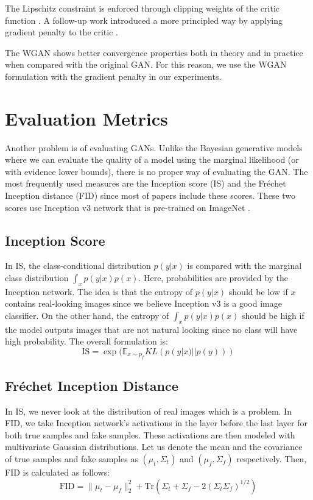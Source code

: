 \documentclass[a4paper,onesided,12pt]{report}
\begin{document}
The Lipschitz constraint is enforced through clipping weights of the critic function \cite{arjovsky2017wasserstein}. A follow-up work introduced a more principled way by applying gradient penalty to the critic \cite{gulrajani2017improved}.

The WGAN shows better convergence properties both in theory and in practice when compared with the original GAN. For this reason, we use the WGAN formulation with the gradient penalty \cite{gulrajani2017improved} in our experiments.

\section{Evaluation Metrics}
\label{sec:evaluation}

Another problem is of evaluating GANs. Unlike the Bayesian generative models where we can evaluate the quality of a model using the marginal likelihood (or with evidence lower bounds), there is no proper way of evaluating the GAN. The most frequently used measures are the Inception score (IS) \cite{salimans2016improved} and the Fr\'echet Inception distance (FID) \cite{heusel2017gans} since most of papers include these scores. These two scores use Inception v3 network \cite{szegedy2016rethinking} that is pre-trained on ImageNet \cite{deng2009imagenet}.

\subsection{Inception Score}
\label{subsec:is}
In IS, the class-conditional distribution $p(y|x)$ is compared with the marginal class distribution $\int_x p(y|x) p(x)$. Here, probabilities are provided by the Inception network. The idea is that the entropy of $p(y|x)$ should be low if $x$ contains real-looking images since we believe Inception v3 is a good image classifier. On the other hand, the entropy of $\int_x p(y | x) p(x)$ should be high if the model outputs images that are not natural looking since no class will have high probability. The overall formulation is:
\begin{equation}
\label{eq:is}
\text{IS}=\exp (\mathbb{E}_{x \sim p_f} KL (p(y|x) || p(y))) 
\end{equation}

\subsection{Fr\'echet Inception Distance}
\label{subsec:fid}
In IS, we never look at the distribution of real images which is a problem. In FID, we take Inception network's activations in the layer before the last layer for both true samples and fake samples. These activations are then modeled with multivariate Gaussian distributions. Let us denote the mean and the covariance of true samples and fake samples as $(\mu_t, \Sigma_t)$ and $(\mu_f, \Sigma_f)$ respectively. Then, FID is calculated as follows:
\begin{equation}
\label{eq:fid}
\text{FID} = \| \mu_t - \mu_f \|_2^2 + \text{Tr}(\Sigma_t + \Sigma_f - 2(\Sigma_t \Sigma_f)^{1/2})
\end{equation}
\end{document}
